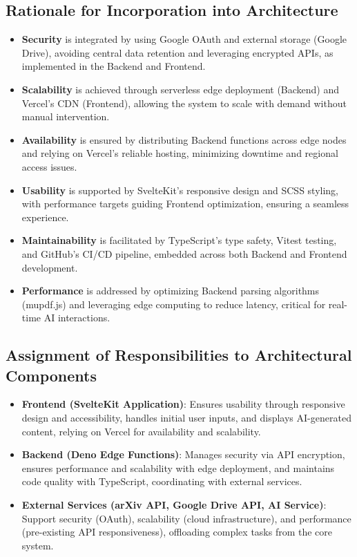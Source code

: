 \documentclass[12pt]{article}
\begin{document}
\subsection{Rationale for Incorporation into Architecture}
\begin{itemize}
  \item \textbf{Security} is integrated by using Google OAuth and external storage (Google Drive), avoiding central data retention and leveraging encrypted APIs, as implemented in the Backend and Frontend.
  \item \textbf{Scalability} is achieved through serverless edge deployment (Backend) and Vercel's CDN (Frontend), allowing the system to scale with demand without manual intervention.
  \item \textbf{Availability} is ensured by distributing Backend functions across edge nodes and relying on Vercel's reliable hosting, minimizing downtime and regional access issues.
  \item \textbf{Usability} is supported by SvelteKit's responsive design and SCSS styling, with performance targets guiding Frontend optimization, ensuring a seamless experience.
  \item \textbf{Maintainability} is facilitated by TypeScript's type safety, Vitest testing, and GitHub's CI/CD pipeline, embedded across both Backend and Frontend development.
  \item \textbf{Performance} is addressed by optimizing Backend parsing algorithms (mupdf.js) and leveraging edge computing to reduce latency, critical for real-time AI interactions.
\end{itemize}

\subsection{Assignment of Responsibilities to Architectural Components}
\begin{itemize}
  \item \textbf{Frontend (SvelteKit Application)}: Ensures usability through responsive design and accessibility, handles initial user inputs, and displays AI-generated content, relying on Vercel for availability and scalability.
  \item \textbf{Backend (Deno Edge Functions)}: Manages security via API encryption, ensures performance and scalability with edge deployment, and maintains code quality with TypeScript, coordinating with external services.
  \item \textbf{External Services (arXiv API, Google Drive API, AI Service)}: Support security (OAuth), scalability (cloud infrastructure), and performance (pre-existing API responsiveness), offloading complex tasks from the core system.
\end{itemize}
\end{document}
